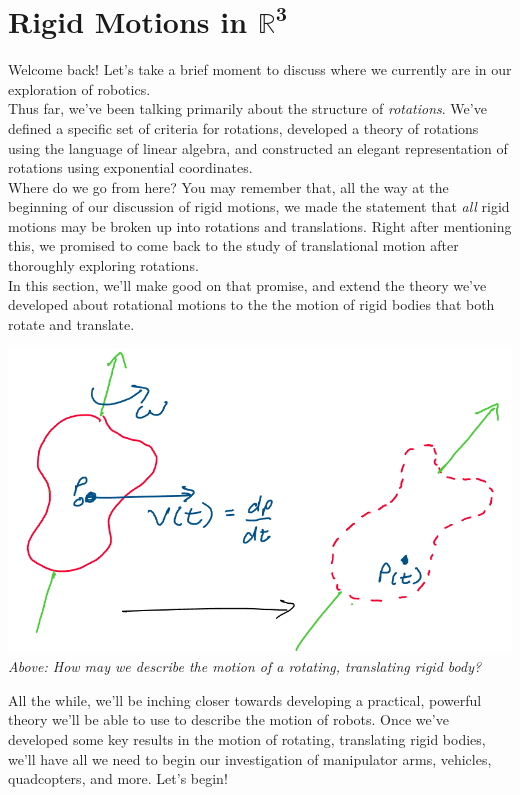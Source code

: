 \documentclass[oneside]{book}
\begin{document}
\section{Rigid Motions in $\mathbf{\mathbb{R}^3}$}
Welcome back! Let's take a brief moment to discuss where we currently are in our exploration of robotics.\\
Thus far, we've been talking primarily about the structure of \textit{rotations}. We've defined a specific set of criteria for rotations, developed a theory of rotations using the language of linear algebra, and constructed an elegant representation of rotations using exponential coordinates.\\
Where do we go from here? You may remember that, all the way at the beginning of our discussion of rigid motions, we made the statement that \textit{all} rigid motions may be broken up into rotations and translations. Right after mentioning this, we promised to come back to the study of translational motion after thoroughly exploring rotations.\\
In this section, we'll make good on that promise, and extend the theory we've developed about rotational motions to the the motion of rigid bodies that both rotate and translate.
\begin{center}
    \includegraphics[scale=0.3]{images/rigidmotion.png}\\
    \textit{Above: How may we describe the motion of a rotating, translating rigid body?}
\end{center}
All the while, we'll be inching closer towards developing a practical, powerful theory we'll be able to use to describe the motion of robots. Once we've developed some key results in the motion of rotating, translating rigid bodies, we'll have all we need to begin our investigation of manipulator arms, vehicles, quadcopters, and more. Let's begin!
\end{document}
